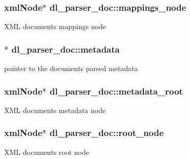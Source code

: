 \subsubsection[{\texorpdfstring{mappings\+\_\+node}{mappings_node}}]{\setlength{\rightskip}{0pt plus 5cm}xml\+Node$\ast$ dl\+\_\+parser\+\_\+doc\+::mappings\+\_\+node}\hypertarget{structdl__parser__doc_ab22e9a4005d93564188d786b878786dd}{}\label{structdl__parser__doc_ab22e9a4005d93564188d786b878786dd}
X\+ML document\textquotesingle{}s mappings node 
\subsubsection[{\texorpdfstring{metadata}{metadata}}]{$\ast$ dl\+\_\+parser\+\_\+doc\+::metadata}\hypertarget{structdl__parser__doc_aed7768f7af6c53d24b4110b8163c8c27}{}\label{structdl__parser__doc_aed7768f7af6c53d24b4110b8163c8c27}
pointer to the documents parsed metadata 
\subsubsection[{\texorpdfstring{metadata\+\_\+root}{metadata_root}}]{\setlength{\rightskip}{0pt plus 5cm}xml\+Node$\ast$ dl\+\_\+parser\+\_\+doc\+::metadata\+\_\+root}\hypertarget{structdl__parser__doc_a08c1f4a9ca83844d75f7caf2a74eec6d}{}\label{structdl__parser__doc_a08c1f4a9ca83844d75f7caf2a74eec6d}
X\+ML document\textquotesingle{}s metadata node 
\subsubsection[{\texorpdfstring{root\+\_\+node}{root_node}}]{\setlength{\rightskip}{0pt plus 5cm}xml\+Node$\ast$ dl\+\_\+parser\+\_\+doc\+::root\+\_\+node}\hypertarget{structdl__parser__doc_a66e2772a6557aafd00370ecad3a6b428}{}\label{structdl__parser__doc_a66e2772a6557aafd00370ecad3a6b428}
X\+ML document\textquotesingle{}s root node 
